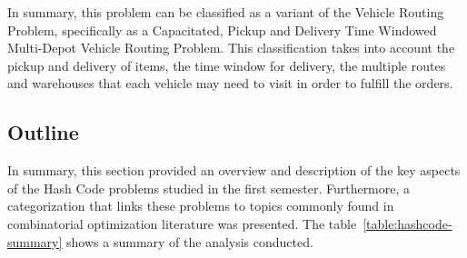 In summary, this problem can be classified as a variant of the Vehicle Routing
Problem, specifically as a Capacitated, Pickup and Delivery Time Windowed
Multi-Depot Vehicle Routing Problem. This classification takes into account the
pickup and delivery of items, the time window for delivery, the multiple
routes and warehouses that each vehicle may need to visit in order to fulfill
the orders.

\subsection{Outline}

In summary, this section provided an overview and description of the key aspects
of the Hash Code problems studied in the first semester. Furthermore, a
categorization that links these problems to topics commonly found in combinatorial
optimization literature was presented. The table~\ref{table:hashcode-summary}
shows a summary of the analysis conducted.

\begin{table}[ht]
  \centering
  \caption{Categorization of Google Hash Code Problems}
  \label{table:hashcode-summary}
\end{table}


